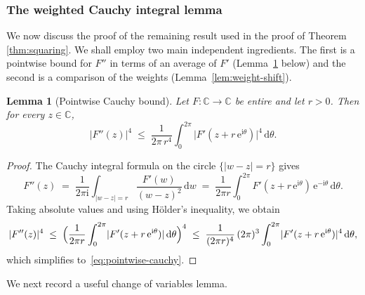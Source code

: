 \documentclass[11pt]{amsart}
\newtheorem{lemma}[theorem]{Lemma}
\theoremstyle{remark}
\newcommand{\C}{\mathbb{C}}
\newcommand{\abs}[1]{\lvert #1 \rvert}
\newcommand{\dd}{\mathrm{d}}
\newcommand{\ee}{\mathrm{e}}
\newcommand{\ii}{\mathrm{i}}
\begin{document}
\subsubsection{The weighted Cauchy integral lemma}\label{sec:weighted-cauchy}
We now discuss the proof of the remaining result used in the proof of Theorem \ref{thm:squaring}. We shall employ two main independent ingredients. The first is a pointwise  bound for $F''$ in terms of an average of
$F'$ (Lemma~\ref{lem:pointwise-cauchy} below) and the second is a comparison
of the weights (Lemma~\ref{lem:weight-shift}). %

\begin{lemma}[Pointwise Cauchy bound]\label{lem:pointwise-cauchy}
Let $F \colon \C \to \C$ be entire and let $r > 0$.  Then for every
$z \in \C$,
\begin{equation}\label{eq:pointwise-cauchy}
\abs{F''(z)}^{4}
\;\le\;
\frac{1}{2\pi\, r^{4}} \int_{0}^{2\pi}
\abs{F'(z + r\,\ee^{\ii\theta})}^{4}\, \dd\theta.
\end{equation}
\end{lemma}

\begin{proof}
The Cauchy integral formula on the circle $\{\abs{w-z} = r\}$ gives
\[
F''(z)
\;=\;
\frac{1}{2\pi\ii}\int_{\abs{w-z}=r} \frac{F'(w)}{(w-z)^{2}}\,\dd w
\;=\;
\frac{1}{2\pi r}\int_{0}^{2\pi} F'(z + r\,\ee^{\ii\theta})\,
\ee^{-\ii\theta}\,\dd\theta.
\]
Taking absolute values and using H\"older's inequality, we obtain
\[
\abs{F''(z)}^{4}
\;\le\;
\Bigl(\frac{1}{2\pi r}\int_{0}^{2\pi}
\abs{F'(z + r\,\ee^{\ii\theta})}\,\dd\theta\Bigr)^{4}
\;\le\;
\frac{1}{(2\pi r)^{4}}\,(2\pi)^{3}
\int_{0}^{2\pi}\abs{F'(z + r\,\ee^{\ii\theta})}^{4}\,\dd\theta,
\]
which simplifies to~\eqref{eq:pointwise-cauchy}.
\end{proof}

We next record a useful change of variables lemma. %
\end{document}
